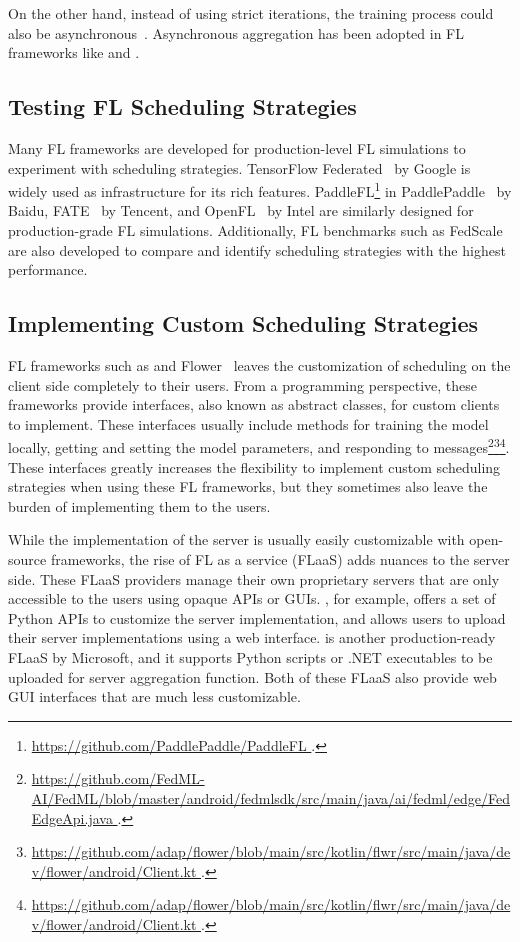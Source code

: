 \documentclass[conference]{IEEEtran}
\begin{document}
On the other hand,
instead of using strict iterations,
the training process could also be
asynchronous~\cite{chilimbi2014project,zhu2022online,huba2022papaya}.
Asynchronous aggregation has been adopted in
FL frameworks like \FedML{} and \Florida{}.

\subsection{Testing FL Scheduling Strategies}

Many FL frameworks are developed for production-level FL simulations to
experiment with scheduling strategies.
TensorFlow Federated~\cite{tff} by Google is widely used as infrastructure for
its rich features.
PaddleFL\footnote{\url{
    https://github.com/PaddlePaddle/PaddleFL
}.} in PaddlePaddle~\cite{ma2019paddlepaddle} by Baidu,
FATE~\cite{liu2021fate} by Tencent, and
OpenFL~\cite{patrick2022openfl} by Intel
are similarly designed for
production-grade FL simulations.
Additionally,
FL benchmarks such as FedScale~\cite{lai2022fedscale} are also developed to
compare and identify scheduling strategies with the highest performance.

\subsection{Implementing Custom Scheduling Strategies}

FL frameworks such as \FedML{} and
Flower~\cite{beutel2020flower} leaves the customization of
scheduling on the client side completely to their users.
From a programming perspective,
these frameworks provide interfaces,
also known as abstract classes,
for custom clients to implement.
These interfaces usually include methods for
training the model locally,
getting and setting the model parameters,
and responding to messages\footnote{\url{
    https://github.com/FedML-AI/FedML/blob/master/android/fedmlsdk/src/main/java/ai/fedml/edge/FedEdgeApi.java
}.}\footnote{\url{
    https://github.com/adap/flower/blob/main/src/kotlin/flwr/src/main/java/dev/flower/android/Client.kt
}.}\footnote{\url{
    https://github.com/adap/flower/blob/main/src/kotlin/flwr/src/main/java/dev/flower/android/Client.kt
}.}.
These interfaces greatly increases the flexibility to
implement custom scheduling strategies when using these FL frameworks,
but they sometimes also leave the burden of implementing them to the users.

While the implementation of the server is usually easily customizable with
open-source frameworks,
the rise of FL as a service (FLaaS)
adds nuances to the server side.
These FLaaS providers manage their own proprietary servers that
are only accessible to the users using opaque APIs or GUIs.
\FedML{}, for example,
offers a set of Python APIs to customize the server implementation,
and allows users to upload their server implementations using a web interface.
\Florida{} is another production-ready FLaaS by Microsoft,
and it supports Python scripts or .NET executables to be uploaded for
server aggregation function.
Both of these FLaaS also provide web GUI interfaces that
are much less customizable.
\end{document}
